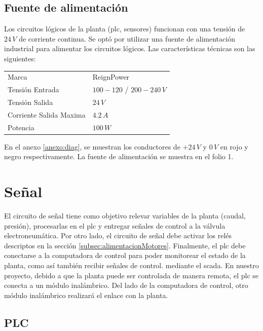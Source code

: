 \subsection{Fuente de alimentación}
Los circuitos lógicos de la planta (\gls{plc}, sensores) funcionan con una 
tensión de $24\,V$ de
corriente continua. Se optó por utilizar una 
fuente de alimentación
industrial para alimentar los circuitos lógicos. Las 
características técnicas son las
siguientes:
\begin{center}
\begin{tabular}{|l|l|}
\hline
Marca & ReignPower\\
Tensión Entrada& $100-120$ / $200-240\,V$\\
Tensión Salida& $24\,V$\\
Corriente Salida Maxima& $4.2\,A$\\
Potencia & $100\,W$\\
\hline
\end{tabular}
\end{center}

En el anexo \ref{anexo:diag}, se 
muestran los conductores de $+24\,V$ y $0\,V$ en rojo y negro 
respectivamente. La fuente de alimentación se muestra en 
el folio 1.

\section{Señal}
\label{sec:Senal}

El circuito de señal tiene como objetivo relevar variables de la planta (caudal,
presión), procesarlas  en el \gls{plc} y entregar señales de control a la 
válvula electroneumática. 
Por otro lado, el circuito de señal debe activar los relés 
descriptos en la sección \ref{subsec:alimentacionMotores}. 
Finalmente, el \gls{plc} debe conectarse a la computadora de control para poder 
monitorear el estado de la planta, como así también recibir señales de control.
mediante el \gls{scada}.
En nuestro proyecto, debido a que la planta puede ser controlada de manera 
remota, el \gls{plc} se conecta a un módulo inalámbrico. Del lado de la 
computadora de control, otro módulo inalámbrico realizará el enlace con la 
planta.

\subsection{PLC}
\label{subsec:plc}

